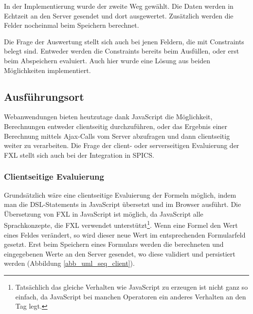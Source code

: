 In der Implementierung wurde der zweite Weg gewählt. Die Daten werden in Echtzeit an den Server gesendet und dort ausgewertet. Zu\-sätz\-lich werden die Felder nocheinmal beim Speichern berechnet.

Die Frage der Auswertung stellt sich auch bei jenen Feldern, die mit Constraints belegt sind. Entweder werden die Constraints bereits beim Ausfüllen, oder erst beim Abspeichern evaluiert. Auch hier wurde eine Lösung aus beiden Möglichkeiten implementiert. 


\subsection{Aus\-führ\-ungsort}
\label{integration_ausfuehrungsort}

Webanwendungen bieten heutzutage dank Java\-Script die Möglichkeit, Berechnungen entweder clientseitig durchzuführen, oder das Ergebnis einer Berechnung mittels Ajax-Calls vom Server abzufragen und dann clientseitig weiter zu verarbeiten. Die Frage der client- oder serverseitigen Evaluierung der FXL stellt sich auch bei der Integration in SPICS.

\subsubsection{Clientseitige Evaluierung}

Grundsätzlich wäre eine clientseitige Evaluierung der Formeln möglich, indem man die DSL-Statements in Java\-Script übersetzt und im Browser ausführt. Die Übersetzung von FXL in Java\-Script ist möglich, da Java\-Script alle Sprachkonzepte, die FXL verwendet unterstützt\footnote{Tatsächlich das gleiche Verhalten wie Java\-Script zu erzeugen ist nicht ganz so einfach, da Java\-Script bei manchen Operatoren ein anderes Verhalten an den Tag legt.}. Wenn eine Formel den Wert eines Feldes verändert, so wird dieser neue Wert im ent\-sprech\-enden Formularfeld gesetzt. Erst beim Speichern eines Formulars werden die berechneten und eingegebenen Werte an den Server gesendet, wo diese validiert und persistiert werden (Abbildung \ref{abb_uml_seq_client}).

